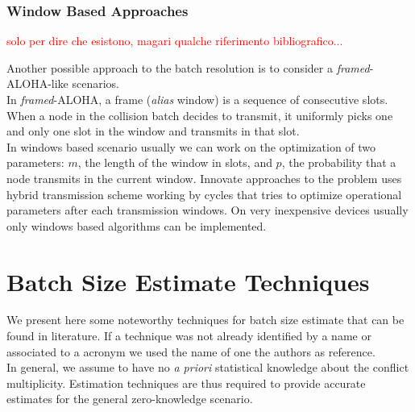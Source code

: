 \documentclass[12pt,a4paper]{report}
\begin{document}
\subsection{Window Based Approaches}
\textcolor{red}{solo per dire che esistono, magari qualche riferimento bibliografico...\\}

Another possible approach to the batch resolution is to consider a \emph{framed}-ALOHA-like scenarios.\\
In \emph{framed}-ALOHA, a frame (\emph{alias} window) is a sequence of consecutive slots.  When a node in the collision batch decides to transmit, it uniformly picks one and only one slot in the window and transmits in that slot.\\
In windows based scenario usually we can work on the optimization of two parameters: $m$, the length of the window in slots, and $p$, the probability that a node transmits in the current window.
Innovate approaches to the problem uses hybrid transmission scheme working by cycles that tries to optimize operational parameters after each transmission windows. On very inexpensive devices usually only windows based algorithms can be implemented.


\chapter{Batch Size Estimate Techniques}
\label{ch:Batch Size Estimate Techniques}
We present here some noteworthy techniques for batch size estimate that can be found in literature.
If a technique was not already identified by a name or associated to a acronym we used the name of one the authors as reference.\\

In general, we assume to have no \emph{a priori} statistical knowledge about the conflict multiplicity. Estimation techniques are thus required to provide accurate estimates for the general zero-knowledge scenario.\\
\end{document}
